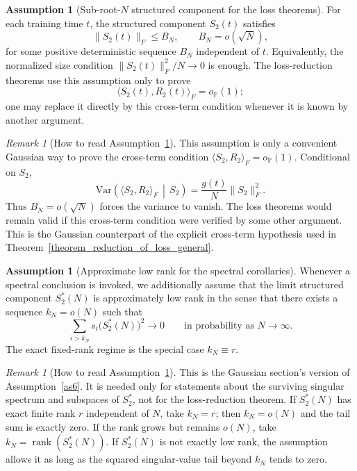 \documentclass[11pt]{article}
\theoremstyle{plain}
\theoremstyle{definition}
\newtheorem{assumption}[thm]{Assumption}
\theoremstyle{remark}
\newtheorem{rem}[thm]{Remark}
\newcommand{\PP}{\mathbb{P}}
\newcommand{\rank}{\operatorname{rank}}
\newcommand{\1}{\mathbf{1}}
\begin{document}
\begin{assumption}[Sub-root-\(N\) structured component for the loss theorems]
\label{as3}
For each training time \(t\), the structured component \(S_2(t)\) satisfies
\[
\|S_2(t)\|_F\le B_N,
\qquad
B_N=o(\sqrt N),
\]
for some positive deterministic sequence \(B_N\) independent of \(t\). Equivalently, the normalized size condition \(\|S_2(t)\|_F^2/N\to0\) is enough. The loss-reduction theorems use this assumption only to prove
\[
\langle S_2(t),R_2(t)\rangle_F=o_{\PP}(1);
\]
one may replace it directly by this cross-term condition whenever it is known by another argument.
\end{assumption}

\begin{rem}[How to read Assumption~\ref{as3}]
This assumption is only a convenient Gaussian way to prove the cross-term condition \(\langle S_2,R_2\rangle_F=o_{\PP}(1)\).  Conditional on \(S_2\),
\[
\mathrm{Var}\!\left(\langle S_2,R_2\rangle_F\,\middle|\,S_2\right)
=
\frac{g(t)}{N}\|S_2\|_F^2.
\]
Thus \(B_N=o(\sqrt N)\) forces the variance to vanish.  The loss theorems would remain valid if this cross-term condition were verified by some other argument.  This is the Gaussian counterpart of the explicit cross-term hypothesis used in Theorem~\ref{theorem_reduction_of_loss_general}.
\end{rem}

\begin{assumption}[Approximate low rank for the spectral corollaries]
\label{as3spectral}
Whenever a spectral conclusion is invoked, we additionally assume that the limit structured component \(S_2^*(N)\) is approximately low rank in the sense that there exists a sequence \(k_N=o(N)\) such that
\[
\sum_{i>k_N}s_i\!\big(S_2^*(N)\big)^2\to0
\qquad\text{in probability as }N\to\infty.
\]
The exact fixed-rank regime is the special case \(k_N\equiv r\).
\end{assumption}

\begin{rem}[How to read Assumption~\ref{as3spectral}]
This is the Gaussian section's version of Assumption~\ref{as6}.  It is needed only for statements about the surviving singular spectrum and subspaces of \(S_2^*\), not for the loss-reduction theorem.  If \(S_2^*(N)\) has exact finite rank \(r\) independent of \(N\), take \(k_N=r\); then \(k_N=o(N)\) and the tail sum is exactly zero.  If the rank grows but remains \(o(N)\), take \(k_N=\rank(S_2^*(N))\).  If \(S_2^*(N)\) is not exactly low rank, the assumption allows it as long as the squared singular-value tail beyond \(k_N\) tends to zero.
\end{rem}
\end{document}

